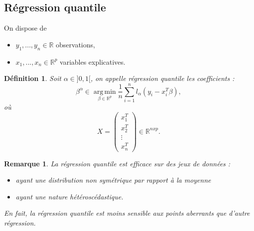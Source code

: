 \documentclass{article}
\DeclareMathOperator*{\argmin}{arg\,min}
\newtheorem{definition}{Définition}
\newtheorem{remark}{Remarque}
\begin{document}
\subsection{Régression quantile}
On dispose de 
\begin{itemize}
    \item $y_1, ..., y_n \in \mathbb{R}$ observations,
    \item $x_1, ..., x_n \in \mathbb{R}^p$ variables explicatives.
\end{itemize}
\vspace{0.1cm}
\begin{definition}
Soit $\alpha \in ]0,1[$, on appelle \textit{régression quantile} les coefficients :
$$\beta^{\alpha} \in \argmin\limits_{\beta \in \mathbb{R}^p} \frac{1}{n} \sum\limits_{i=1}^{n} l_{\alpha}(y_i - x_i^T\beta),$$
où 
$$X = \begin{pmatrix}
x_1^T \\
x_2^T \\
\vdots\\
x_n^T
\end{pmatrix} 
\in \mathbb{R}^{nxp}.$$
\end{definition}
\vspace{0.1cm}
\begin{remark}
La régression quantile est efficace sur des jeux de données : 
\begin{itemize}
    \item ayant une distribution non symétrique par rapport à la moyenne
    \item ayant une nature hétéroscédastique.
\end{itemize}
En fait, la régression quantile est moins sensible aux points aberrants que d'autre régression.
\end{remark}
\vspace{0.1cm}
\end{document}
